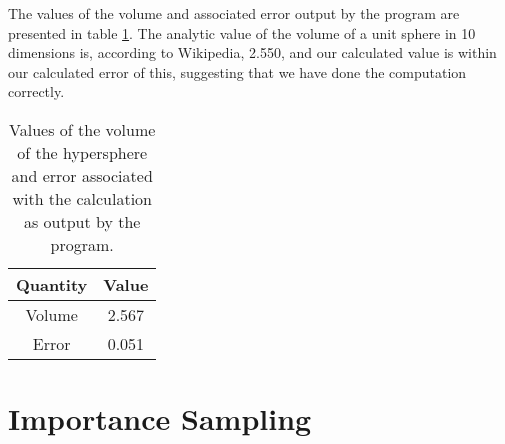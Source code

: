 \documentclass{article}
\begin{document}
The values of the volume and associated error output by the program are presented in table \ref{tab:q2}. The analytic value of the volume of a unit sphere in 10 dimensions is, according to Wikipedia, 2.550, and our calculated value is within our calculated error of this, suggesting that we have done the computation correctly.

\begin{table}[H]
	\centering
	\caption{Values of the volume of the hypersphere and error associated with the calculation as output by the program.}
	\label{tab:q2}
	\begin{tabular}{c|c}
		Quantity & Value \\
		\hline
		Volume & 2.567 \\
		Error & 0.051
	\end{tabular}
\end{table}

\section{Importance Sampling}
\end{document}
